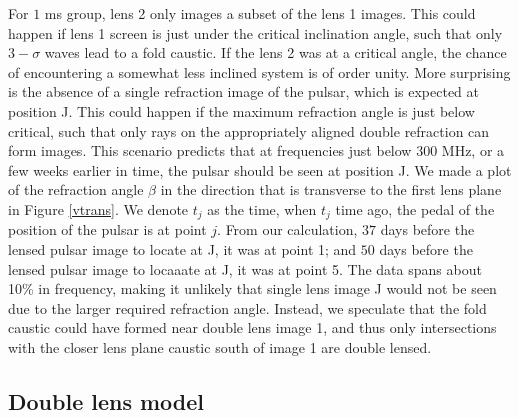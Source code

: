 \documentclass[useAMS,usenatbib]{mn2e}
\begin{document}
For $1$ ms group, lens 2
only images a subset of the lens 1 images.  This could happen if
lens 1 screen is just under the critical inclination
angle, such that only $3-\sigma$ waves lead to a fold caustic.  If the lens 2 was at a critical angle, the chance of encountering a
somewhat less inclined system is of order unity.
More surprising is the absence of a single refraction
image of the pulsar, which is expected at position J.  This could
happen if the maximum refraction angle is just below critical, such
that only rays on the appropriately aligned double refraction can form
images.  This scenario predicts that at frequencies just below $300$
MHz, or a few weeks earlier in time, the pulsar should be seen at
position J. We made a plot of the refraction angle $\beta$ in the
direction that is transverse to the first lens plane in Figure
\ref{vtrans}.  We denote $t_j$ as the time, when $t_j$ time ago, the pedal of the position of the pulsar is at point $j$. From our calculation, $37$ days before the lensed pulsar
 image to locate at J, it was at point 1; and $50$ days before the lensed pulsar image to locaaate at J, it was at point 5.  The data
spans about 10\% in frequency, making it unlikely that single lens
image J would not be seen due to the larger required refraction
angle.  Instead, we speculate that the fold caustic could have formed
near double lens image 1, and thus only intersections with the closer
lens plane caustic south of image 1 are double lensed.

\subsection{Double lens model}
\label{doublelensmodel}
\end{document}
